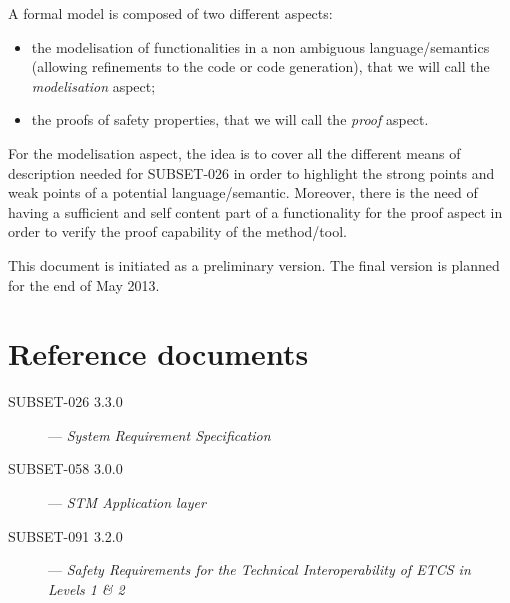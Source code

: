 \documentclass{template/openetcs_report}
\begin{document}
A formal model is composed of two different aspects:
\begin{itemize}
\item the modelisation of functionalities in a non ambiguous language/semantics (allowing refinements to the code or code generation), that we will call the \emph{modelisation} aspect;
\item the proofs of safety properties, that we will call the \emph{proof} aspect.
\end{itemize}

For the modelisation aspect, the idea is to cover all the different means of description needed for SUBSET-026 in order to highlight the strong points and weak points of a potential language/semantic.
Moreover, there is the need of having a sufficient and self content part of a functionality for the proof aspect in order to verify the proof capability of the method/tool.

This document is initiated as a preliminary version. The final version is planned for the end of May 2013.

\chapter{Reference documents}
\begin{description}
\item [SUBSET-026 3.3.0] --- \emph{System Requirement Specification}
\item [SUBSET-058 3.0.0] --- \emph{STM Application layer}
\item [SUBSET-091 3.2.0] --- \emph{Safety Requirements for the Technical Interoperability of ETCS in Levels 1 \& 2}
\end{description}
\end{document}

